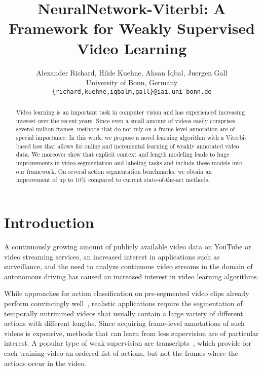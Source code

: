 \documentclass[10pt,twocolumn,letterpaper]{article}
\begin{document}
\title{NeuralNetwork-Viterbi: A Framework for Weakly Supervised Video Learning}

\author{Alexander Richard, Hilde Kuehne, Ahsan Iqbal, Juergen Gall\\
University of Bonn, Germany\\
{\tt\small \{richard,kuehne,iqbalm,gall\}@iai.uni-bonn.de}
}

\maketitle


\begin{abstract}
    Video learning is an important task in computer vision and has experienced
    increasing interest over the recent years. Since even a small amount of videos
    easily comprises several million frames, methods that do not rely on a frame-level
    annotation are of special importance.
    In this work, we propose a novel learning algorithm with a
    Viterbi-based loss that allows for online and incremental learning of weakly
    annotated video data. We moreover show that explicit context and length modeling
    leads to huge improvements in video segmentation and labeling tasks and
    include these models into our framework.
    On several action segmentation benchmarks, we obtain an improvement of up to
    10\% compared to current state-of-the-art methods.
\end{abstract}
\vspace{-0.5cm}


\section{Introduction}
\label{sec:introduction}

A continuously growing amount of publicly available video data on YouTube
or video streaming services, an increased interest in applications
such as surveillance, and the need to analyze continuous video streams \eg in the
domain of autonomous driving has caused an increased interest in video learning
algorithms.

While approaches for action classification on pre-segmented video clips already
perform convincingly well~\cite{simonyan2014two, wang2016temporal,carreira2017quovadis,feichtenhofer2017residual},
realistic applications require the segmentation of temporally untrimmed videos
that usually contain a large variety of different actions with different lengths.
Since acquiring frame-level annotations of such videos is expensive,
methods that can learn from less supervision are of particular interest.
A popular type of weak supervision are transcripts~\cite{bojanowski14weakly,huang2016connectionist,kuehne2017weakly,richard2017weakly,koller2016deephand,koller2017resign}, which provide for each training video an ordered list of actions, but not the frames where the actions occur in the video. 
\end{document}
